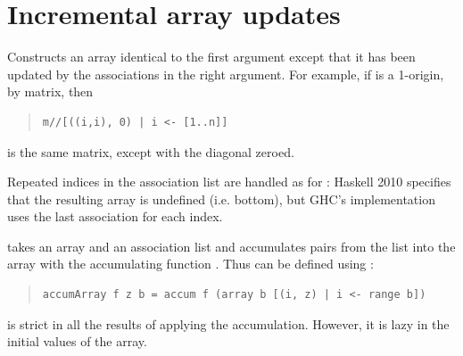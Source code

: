 \section{Incremental array updates}
\begin{haddockdesc}
\item[\begin{tabular}{@{}l}
(//) :: Ix i => Array i e -> {\char 91}(i, e){\char 93} -> Array i e
\end{tabular}]
{\haddockbegindoc
Constructs an array identical to the first argument except that it has
 been updated by the associations in the right argument.
 For example, if  is a 1-origin,  by  matrix, then\par
\begin{quote}
{\haddockverb\begin{verbatim}
m//[((i,i), 0) | i <- [1..n]]\end{verbatim}}
\end{quote}
is the same matrix, except with the diagonal zeroed.\par
Repeated indices in the association list are handled as for :
 Haskell 2010 specifies that the resulting array is undefined (i.e. bottom),
 but GHC's implementation uses the last association for each index.\par}
\end{haddockdesc}
\begin{haddockdesc}
\item[\begin{tabular}{@{}l}
accum :: Ix i => (e -> a -> e) -> Array i e -> {\char 91}(i, a){\char 93} -> Array i e
\end{tabular}]
{\haddockbegindoc
{} takes an array and an association list and accumulates
 pairs from the list into the array with the accumulating function .
 Thus  can be defined using :\par
\begin{quote}
{\haddockverb\begin{verbatim}
accumArray f z b = accum f (array b [(i, z) | i <- range b])\end{verbatim}}
\end{quote}
 is strict in all the results of applying the accumulation.
 However, it is lazy in the initial values of the array.\par}
\end{haddockdesc}
